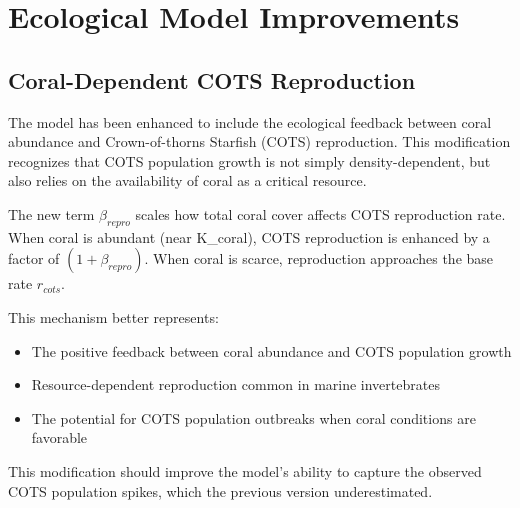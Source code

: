 \section{Ecological Model Improvements}

\subsection{Coral-Dependent COTS Reproduction}

The model has been enhanced to include the ecological feedback between coral abundance and Crown-of-thorns Starfish (COTS) reproduction. This modification recognizes that COTS population growth is not simply density-dependent, but also relies on the availability of coral as a critical resource.

The new term $\beta_{repro}$ scales how total coral cover affects COTS reproduction rate. When coral is abundant (near K\_coral), COTS reproduction is enhanced by a factor of $(1 + \beta_{repro})$. When coral is scarce, reproduction approaches the base rate $r_{cots}$.

This mechanism better represents:
\begin{itemize}
    \item The positive feedback between coral abundance and COTS population growth
    \item Resource-dependent reproduction common in marine invertebrates
    \item The potential for COTS population outbreaks when coral conditions are favorable
\end{itemize}

This modification should improve the model's ability to capture the observed COTS population spikes, which the previous version underestimated.
